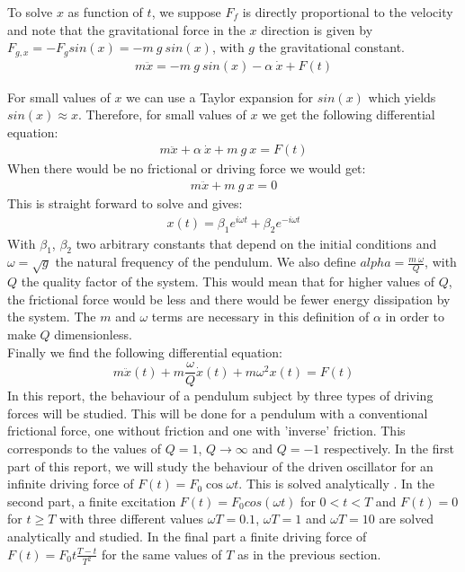To solve $x$ as function of $t$, we suppose $F_f$ is directly proportional to the velocity and note that the gravitational force in the $x$ direction is given by $F_{g,x} = - F_g sin(x) = - m \: g \: sin(x)$, with $g$ the gravitational constant.
\begin{align*}
	m \ddot{x} = - m \: g \: sin(x) - \alpha \: \dot{x} + F(t) 
\end{align*}

For small values of $x$ we can use a Taylor expansion for $sin(x)$ which yields $sin(x) \approx x$. Therefore, for small values of $x$ we get the following differential equation:
\begin{align*}
	m \ddot{x} + \alpha \: \dot{x} + m \: g \: x = F(t) 
\end{align*}
When there would be no frictional or driving force we would get:
\begin{align*}
	m \ddot{x} + m \: g \: x = 0
\end{align*}
This is straight forward to solve and gives:
\begin{align*}
	x(t) = \beta_1 e^{i \omega t} + \beta_2 e^{-i \omega t}
\end{align*}
With $\beta_1$, $\beta_2$ two arbitrary constants that depend on the initial conditions and $\omega = \sqrt{g}$ the natural frequency of the pendulum. We also define $alpha =\frac{m \: \omega}{Q}$, with $Q$ the quality factor of the system. This would mean that for higher values of $Q$, the frictional force would be less and there would be fewer energy dissipation by the system. The $m$ and $\omega$ terms are necessary in this definition of $\alpha$ in order to make $Q$ dimensionless. \\
Finally we find the following differential equation:
\begin{equation}
	m \ddot{x}(t) + m \frac{\omega}{Q} \dot{x}(t) + m \omega^2 x(t) = F(t)
	\label{eq_diff}
\end{equation}
In this report, the behaviour of a pendulum subject by three types of driving forces will be studied. This will be done for a pendulum with a conventional frictional force, one without friction and one with 'inverse' friction. This corresponds to the values of $Q=1$, $Q \rightarrow \infty$ and $Q=-1$ respectively. 
In the first part of this report, we will study the behaviour of the driven oscillator for an infinite driving force of $F(t) = F_0 \cos{\omega t}$. This is solved analytically . In the second part, a finite excitation $F(t) = F_0 cos(\omega t)$ for $0 < t < T$ and $F(t) = 0$ for $t \geq T$ with three different values $\omega T = 0.1$, $\omega T = 1$ and $\omega T = 10$ are solved analytically and studied. In the final part a finite driving force of $ F(t) = F_0 t\frac{T-t}{T^2}$ for the same values of $T$ as in the previous section. \\ 








